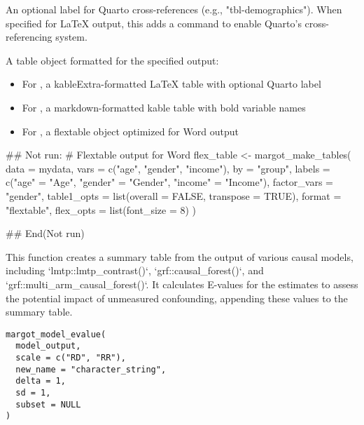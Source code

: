 \documentclass[a4paper]{book}
\begin{document}
\begin{Arguments}
\begin{ldescription}
\begin{itemize}
\end{itemize}


\item[\code{quarto\_label}] An optional label for Quarto cross-references (e.g., "tbl-demographics"). When specified for LaTeX output,
this adds a  command to enable Quarto's cross-referencing system.
\end{ldescription}
\end{Arguments}
%
\begin{Value}
A table object formatted for the specified output:
\begin{itemize}

\item{} For , a kableExtra-formatted LaTeX table with optional Quarto label
\item{} For , a markdown-formatted kable table with bold variable names
\item{} For , a flextable object optimized for Word output

\end{itemize}

\end{Value}
%
\begin{Examples}
\begin{ExampleCode}
## Not run: 
  # Flextable output for Word
  flex_table <- margot_make_tables(
    data = mydata,
    vars = c("age", "gender", "income"),
    by = "group",
    labels = c("age" = "Age", "gender" = "Gender", "income" = "Income"),
    factor_vars = "gender",
    table1_opts = list(overall = FALSE, transpose = TRUE),
    format = "flextable",
    flex_opts = list(font_size = 8)
  )

## End(Not run)

\end{ExampleCode}
\end{Examples}
%
\begin{Description}
This function creates a summary table from the output of various causal models,
including `lmtp::lmtp\_contrast()`, `grf::causal\_forest()`, and `grf::multi\_arm\_causal\_forest()`.
It calculates E-values for the estimates to assess the potential impact of unmeasured confounding,
appending these values to the summary table.
\end{Description}
%
\begin{Usage}
\begin{verbatim}
margot_model_evalue(
  model_output,
  scale = c("RD", "RR"),
  new_name = "character_string",
  delta = 1,
  sd = 1,
  subset = NULL
)
\end{verbatim}
\end{Usage}
\end{document}
